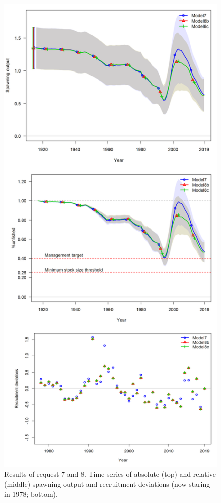 \documentclass[12pt,]{article}
\begin{document}
\begin{figure}
\centering
\includegraphics{Figures/STAR_request8_2.png}
\caption{Results of request 7 and 8. Time series of absolute (top) and
relative (middle) spawning output and recruitment deviations (now
staring in 1978; bottom). \label{fig:STAR_request8_2}}
\end{figure}
\end{document}
